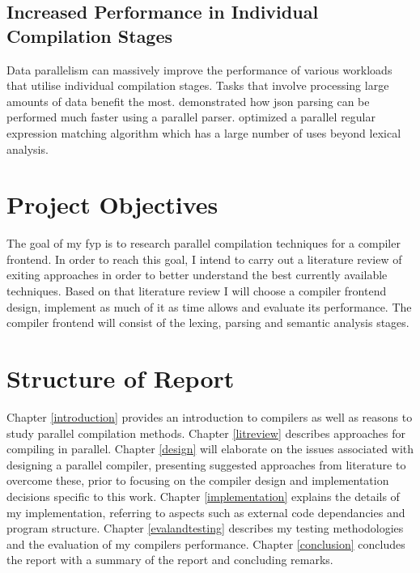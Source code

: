 \subsection{Increased Performance in Individual Compilation Stages}

Data parallelism can massively improve the performance of various workloads
that utilise individual compilation stages. Tasks that involve processing large
amounts of data benefit the most. \cite{barenghi_parallel_2015} demonstrated
how \gls{json} parsing can be performed much faster using a parallel parser.
\cite{mytkowicz_data-parallel_2014} optimized a parallel regular expression
matching algorithm which has a large number of uses beyond lexical analysis.

\section{Project Objectives}

The goal of my \gls{fyp} is to research parallel compilation techniques for
a compiler frontend. In order to reach this goal, I intend to carry out a
literature review of exiting approaches in order to better understand the best
currently available techniques. Based on that literature review I will choose
a compiler frontend design, implement as much of it as time allows and evaluate
its performance. The compiler frontend will consist of the lexing, parsing and
semantic analysis stages.

\section{Structure of Report} \label{structure_of_report}

Chapter \ref{introduction} provides an introduction to compilers as well as
reasons to study parallel compilation methods.
\newline \newline
Chapter \ref{litreview} describes approaches for compiling
in parallel.
\newline \newline
Chapter \ref{design} will elaborate on the issues associated with designing a
parallel compiler, presenting suggested approaches from literature to overcome
these, prior to focusing on the compiler design and implementation decisions
specific to this work.
\newline \newline
Chapter \ref{implementation} explains the details of my implementation,
referring to aspects such as external code dependancies and program structure.
\newline \newline
Chapter \ref{evalandtesting} describes my testing methodologies and the
evaluation of my compilers performance.
\newline \newline
Chapter \ref{conclusion} concludes the report with a summary of the report and
concluding remarks.
